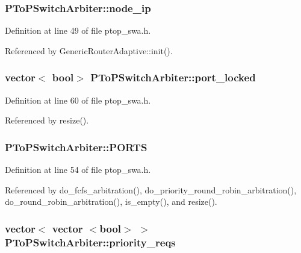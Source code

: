 \subsubsection[{node\_\-ip}]{ {\bf PToPSwitchArbiter::node\_\-ip}}\label{classPToPSwitchArbiter_f6d6c3726dfca65b1dec2d041ce29e97}




Definition at line 49 of file ptop\_\-swa.h.

Referenced by GenericRouterAdaptive::init().
\subsubsection[{port\_\-locked}]{\setlength{\rightskip}{0pt plus 5cm}vector$<$ bool$>$ {\bf PToPSwitchArbiter::port\_\-locked}\hspace{0.3cm}{\tt  [private]}}\label{classPToPSwitchArbiter_b512f01d5e4e47a1fee79144e66238aa}




Definition at line 60 of file ptop\_\-swa.h.

Referenced by resize().
\subsubsection[{PORTS}]{ {\bf PToPSwitchArbiter::PORTS}\hspace{0.3cm}{\tt  [private]}}\label{classPToPSwitchArbiter_a3e7315bd5c36505d05e57f21306632e}




Definition at line 54 of file ptop\_\-swa.h.

Referenced by do\_\-fcfs\_\-arbitration(), do\_\-priority\_\-round\_\-robin\_\-arbitration(), do\_\-round\_\-robin\_\-arbitration(), is\_\-empty(), and resize().
\subsubsection[{priority\_\-reqs}]{\setlength{\rightskip}{0pt plus 5cm}vector$<$ vector $<$bool$>$ $>$ {\bf PToPSwitchArbiter::priority\_\-reqs}\hspace{0.3cm}{\tt  [private]}}\label{classPToPSwitchArbiter_1d935ad033dbac73c9ef14fd279d0356}




